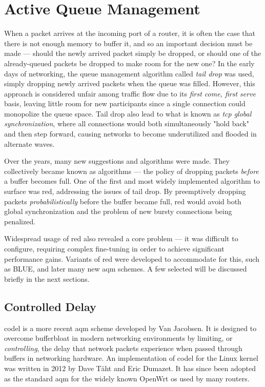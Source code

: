 



\section{Active Queue Management}

When a packet arrives at the incoming port of a router, it is often the case that there is not enough memory to buffer it, and so an important decision must be made --- should the newly arrived packet simply be dropped, or should one of the already-queued packets be dropped to make room for the new one? In the early days of networking, the queue management algorithm called \textit{tail drop} was used, simply dropping newly arrived packets when the queue was filled. However, this approach is considered unfair among traffic flow due to its \textit{first come, first serve} basis, leaving little room for new participants since a single connection could monopolize the queue space. \cite{on_traffic_phase_effects_in_packet_switched_gateways} Tail drop also lead to what is known as \textit{\gls{tcp} global synchronization}, where all connections would both simultaneously "hold back" and then step forward, causing networks to become underutilized and flooded in alternate waves.

Over the years, many new suggestions and algorithms were made. They collectively became known as  algorithms --- the policy of dropping packets \textit{before} a buffer becomes full. One of the first and most widely implemented algorithm to surface was \gls{red}, addressing the issues of tail drop. By preemptively dropping packets \textit{probabilistically} before the buffer became full, \gls{red} would avoid both global synchronization and the problem of new bursty connections being penalized. \cite{ieee251892}

Widespread usage of \gls{red} also revealed a core problem --- it was difficult to configure, requiring complex fine-tuning in order to achieve significant performance gains. Variants of \gls{red} were developed to accommodate for this, such as BLUE, and later many new \gls{aqm} schemes. A few selected will be discussed briefly in the next sections.



\subsection{Controlled Delay}

\gls{codel} is a more recent \gls{aqm} scheme developed by Van Jacobsen. It is designed to overcome bufferbloat in modern networking environments by limiting, or \textit{controlling}, the delay that network packets experience when passed through buffers in networking hardware. An implementation of \gls{codel} for the Linux kernel was written in 2012 by Dave Täht and Eric Dumazet. It has since been adopted as the standard \gls{aqm} for the widely known OpenWrt \gls{os} used by many routers.

